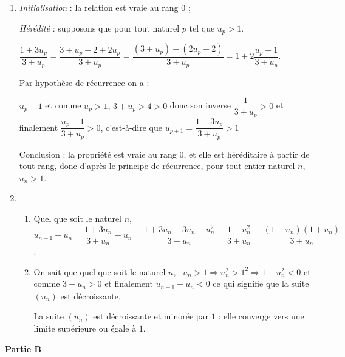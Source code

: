 \documentclass[10pt]{article}
\begin{document}
\begin{enumerate}
\item %
\emph{Initialisation} : la relation est vraie au rang $0$ ;

\emph{Hérédité} : supposons que pour tout naturel $p$ tel que $u_{p} > 1$.

$\dfrac{1 + 3u_{p}}{3 + u_{p}} = \dfrac{3 + u_{p} - 2 + 2u_{p}}{3 + u_{p}} =  \dfrac{\left(3 + u_{p}\right) + \left(2u_{p} - 2\right)}{3 + u_{p}} = 1  + 2\dfrac{u_{p} - 1}{3 + u_{p}}$.

Par hypothèse de récurrence on a :

$u_{p} - 1$ et comme $u_{p} > 1,\, 3 + u_{p} > 4 > 0$ donc son inverse $\dfrac{1}{3 + u_{p}} > 0$ et finalement $\dfrac{u_{p} - 1}{3 + u_{p}} > 0$, c'est-à-dire que $u_{p+1} = \dfrac{1 + 3u_{p}}{3 + u_{p}} > 1$

Conclusion : la propriété est vraie au rang $0$, et elle est héréditaire à partir de tout rang, donc d'après le principe de récurrence,   pour tout entier naturel $n$, \, $u_{n} > 1$.
\item  
	\begin{enumerate}
		\item %
Quel que soit le naturel $n$, \, $u_{n+1}- u_{n} = \dfrac{1 + 3u_{n}}{3 + u_{n}} - u_{n} = \dfrac{1 + 3u_{n} - 3u_{n}- u_{n}^2}{3 + u_{n}} = \dfrac{1 - u_{n}^2}{3 + u_{n}} = \dfrac{\left(1 - u_{n} \right)\left(1 + u_{n} \right)}{3+ u_{n}}$.	
		\item %
On sait que quel que soit le naturel $n$, \, $u_{n} > 1 \Rightarrow u_{n}^2 > 1^2 \Rightarrow 1 - u_{n}^2 < 0$ et comme $3 + u_{n} > 0$ et finalement $u_{n+1}  - u_{n} < 0$ ce qui signifie que la suite $\left(u_{n}\right)$ est décroissante.

La suite $\left(u_{n}\right)$ est décroissante et minorée par $1$ : elle converge vers une limite supérieure ou égale à $1$. 
	\end{enumerate}
\end{enumerate}
	
\bigskip

\textbf{Partie B}

\medskip

%
% 
%
 
\end{document}
